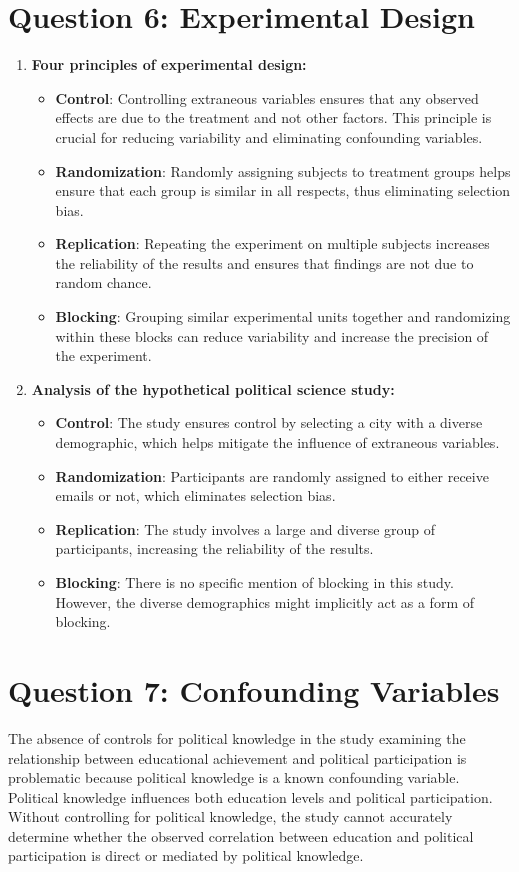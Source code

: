 \documentclass{article}
\begin{document}
\section*{Question 6: Experimental Design}
\begin{enumerate}
    \item \textbf{Four principles of experimental design:}
    \begin{itemize}
        \item \textbf{Control}: Controlling extraneous variables ensures that any observed effects are due to the treatment and not other factors. This principle is crucial for reducing variability and eliminating confounding variables.
        \item \textbf{Randomization}: Randomly assigning subjects to treatment groups helps ensure that each group is similar in all respects, thus eliminating selection bias.
        \item \textbf{Replication}: Repeating the experiment on multiple subjects increases the reliability of the results and ensures that findings are not due to random chance.
        \item \textbf{Blocking}: Grouping similar experimental units together and randomizing within these blocks can reduce variability and increase the precision of the experiment.
    \end{itemize}
    \item \textbf{Analysis of the hypothetical political science study:}
    \begin{itemize}
        \item \textbf{Control}: The study ensures control by selecting a city with a diverse demographic, which helps mitigate the influence of extraneous variables.
        \item \textbf{Randomization}: Participants are randomly assigned to either receive emails or not, which eliminates selection bias.
        \item \textbf{Replication}: The study involves a large and diverse group of participants, increasing the reliability of the results.
        \item \textbf{Blocking}: There is no specific mention of blocking in this study. However, the diverse demographics might implicitly act as a form of blocking.
    \end{itemize}
\end{enumerate}

\section*{Question 7: Confounding Variables}
The absence of controls for political knowledge in the study examining the relationship between educational achievement and political participation is problematic because political knowledge is a known confounding variable. Political knowledge influences both education levels and political participation. Without controlling for political knowledge, the study cannot accurately determine whether the observed correlation between education and political participation is direct or mediated by political knowledge.
\end{document}
